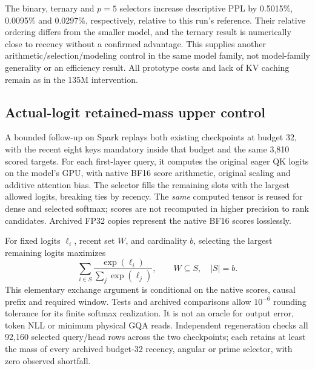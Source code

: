 \documentclass[11pt]{article}
\begin{document}
The binary, ternary and \(p=5\) selectors increase descriptive PPL by
0.5015\%, 0.0095\% and 0.0297\%, respectively, relative to this run's reference.
Their relative ordering differs from the smaller model, and the ternary result
is numerically close to recency without a confirmed advantage. This supplies
another arithmetic/selection/modeling control in the same model family, not
model-family generality or an efficiency result. All prototype costs and
lack of KV caching remain as in the 135M intervention.

\subsection{Actual-logit retained-mass upper control}

A bounded follow-up on Spark replays both existing checkpoints at budget 32,
with the recent eight keys mandatory inside that budget and the same 3,810
scored targets. For each first-layer query, it computes the original eager
QK logits on the model's GPU, with native BF16 score arithmetic, original
scaling and additive attention bias. The selector fills the remaining slots
with the largest allowed logits, breaking ties by recency. The \emph{same}
computed tensor is reused for dense and selected softmax; scores are not
recomputed in higher precision to rank candidates. Archived FP32 copies
represent the native BF16 scores losslessly.

For fixed logits \(\ell_i\), recent set \(W\), and cardinality \(b\), selecting
the largest remaining logits maximizes
\[
 \sum_{i\in S}\frac{\exp(\ell_i)}{\sum_j\exp(\ell_j)},
 \qquad W\subseteq S,\quad |S|=b.
\]
This elementary exchange argument is conditional on the native scores, causal
prefix and required window. Tests and archived comparisons allow \(10^{-6}\)
rounding tolerance for its finite softmax realization. It is not an oracle for
output error, token NLL or minimum physical GQA reads. Independent regeneration
checks all 92,160 selected query/head rows across the two checkpoints; each
retains at least the mass of every archived budget-32 recency, angular or
prime selector, with zero observed shortfall.
\end{document}
